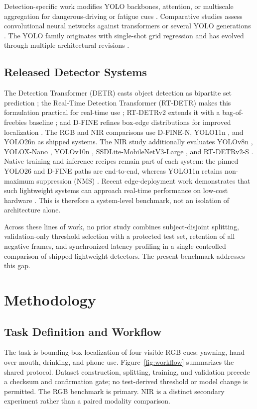 \documentclass[conference]{IEEEtran}
\begin{document}
Detection-specific work modifies YOLO backbones, attention, or multiscale aggregation for dangerous-driving or fatigue cues \cite{wang2024mfyolo,li2024yolosgc,jin2025yolo11cr}. Comparative studies assess convolutional neural networks against transformers \cite{koay2021cnnvit} or several YOLO generations \cite{herath2025yolocomparison}. The YOLO family originates with single-shot grid regression \cite{redmon2016yolo} and has evolved through multiple architectural revisions \cite{bochkovskiy2020yolov4,ultralytics2024yolo11,ultralytics2026}.

\subsection{Released Detector Systems}
The Detection Transformer (DETR) casts object detection as bipartite set prediction \cite{carion2020detr}; the Real-Time Detection Transformer (RT-DETR) makes this formulation practical for real-time use \cite{zhao2024rtdetr}; RT-DETRv2 extends it with a bag-of-freebies baseline \cite{lv2024rtdetrv2}; and D-FINE refines box-edge distributions for improved localization \cite{peng2025dfine}. The RGB and NIR comparisons use D-FINE-N, YOLO11n \cite{ultralytics2024yolo11}, and YOLO26n \cite{ultralytics2026} as shipped systems. The NIR study additionally evaluates YOLOv8n \cite{jocher2023yolov8}, YOLOX-Nano \cite{ge2021yolox}, YOLOv10n \cite{wang2024yolov10}, SSDLite-MobileNetV3-Large \cite{howard2019mobilenetv3}, and RT-DETRv2-S \cite{lv2024rtdetrv2}. Native training and inference recipes remain part of each system: the pinned YOLO26 and D-FINE paths are end-to-end, whereas YOLO11n retains non-maximum suppression (NMS) \cite{bodla2017softnms}. Recent edge-deployment work demonstrates that such lightweight systems can approach real-time performance on low-cost hardware \cite{ahsani2025edge}. This is therefore a system-level benchmark, not an isolation of architecture alone.

Across these lines of work, no prior study combines subject-disjoint splitting, validation-only threshold selection with a protected test set, retention of all negative frames, and synchronized latency profiling in a single controlled comparison of shipped lightweight detectors. The present benchmark addresses this gap.

\section{Methodology}
\subsection{Task Definition and Workflow}
The task is bounding-box localization of four visible RGB cues: yawning, hand over mouth, drinking, and phone use. Figure~\ref{fig:workflow} summarizes the shared protocol. Dataset construction, splitting, training, and validation precede a checksum and confirmation gate; no test-derived threshold or model change is permitted. The RGB benchmark is primary. NIR is a distinct secondary experiment rather than a paired modality comparison.
\end{document}
